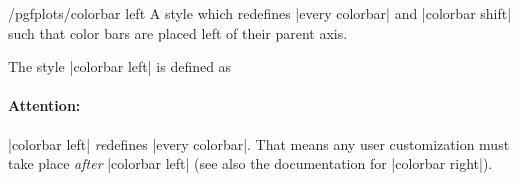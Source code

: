 \begin{stylekey}{/pgfplots/colorbar left}
    A style which redefines |every colorbar| and |colorbar shift| such that
    color bars are placed left of their parent axis.
\begin{codeexample}[]
\end{codeexample}

    The style |colorbar left| is defined as
\begin{codeexample}
\end{codeexample}

    \paragraph{Attention:}

    |colorbar left| \emph{re}defines |every colorbar|. That means any user
    customization must take place \emph{after} |colorbar left| (see also the
    documentation for |colorbar right|).
\end{stylekey}

